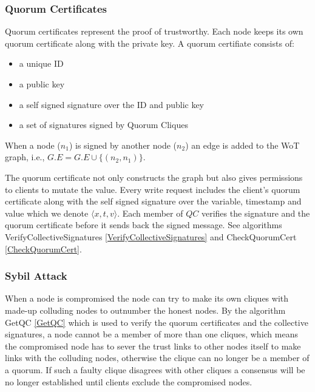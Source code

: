 \subsubsection*{Quorum Certificates}
Quorum certificates represent the proof of trustworthy. Each node
keeps its own quorum certificate along with the private key. 
A quorum certifiate consists of:
\begin{itemize}
\item a unique ID
\item a public key
\item a self signed signature over the ID and public key
\item a set of signatures signed by Quorum Cliques
\end{itemize}
When a node ($n_1$) is signed by another node ($n_2$) an edge is added
to the WoT graph, i.e., $G.E = G.E \cup \{(n_2, n_1)\}$.

The quorum certificate not only constructs the graph but also gives
permissions to clients to mutate the value.
Every {\sf write} request includes the client's quorum certificate
along with the self signed signature over the variable, timestamp and
value which we denote $\langle x, t, v \rangle$.
Each member of $QC$ verifies the signature and the quorum
certificate before it sends back the signed message. See algorithms
{\sf VerifyCollectiveSignatures} \ref{VerifyCollectiveSignatures} and
{\sf CheckQuorumCert} \ref{CheckQuorumCert}.

\subsubsection*{Sybil Attack}
When a node is compromised the node can try to make its own cliques
with made-up colluding nodes to outnumber the honest nodes. By the
algorithm {\sf GetQC} \ref{GetQC} which is used to verify the quorum
certificates and the collective signatures, a node cannot be a
member of more than one cliques, which means the compromised node has
to sever the trust links to other nodes itself to make links with the
colluding nodes, otherwise the clique can no longer be a member of a
quorum. If such a faulty clique disagrees with other cliques a
consensus will be no longer established until clients exclude the
compromised nodes.


